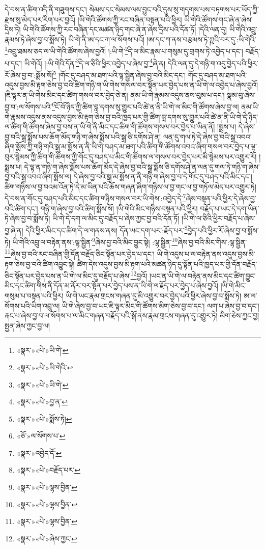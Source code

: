 དེ་བས་ན་ཚིག་འདི་ནི་གཟུགས་དང་། སེམས་དང་སེམས་ལས་བྱུང་བའི་དུས་སུ་གདགས་པས་བཏགས་པར་ཡོད་ཀྱི་རྫས་སུ་མེད་པར་རིག་པར་བྱའོ། །ཡི་གེའི་ཚོགས་ཀྱི་རང་བཞིན་བསྟན་པའི་ཕྱིར། ཡི་གེའི་ཚོགས་གང་ཞེ་ན་ཞེས་དྲིས་ཏེ། ཡི་གེའི་ཚོགས་ཀྱི་རང་བཞིན་དང་མཚན་ཉིད་གང་ཞེ་ན་ཞེས་དྲིས་པའི་དོན་ཏོ། །དེའི་ལན་དུ། ཡི་གེའི་འབྲུ་རྣམས་ཏེ་ཞེས་བྱ་བ་སྨོས་ཏེ། ཡི་གེ་ནི་ཨ་དང་ཀ་ལ་སོགས་པའོ། །ཨ་དང་ཀ་ནས་བརྩམས་ཏེ་ཀྵའི་བར་དུ་:ཡི་གེའི་\footnote{«སྣར་»«པེ་»ཡི་གེ་}འབྲུ་ཐམས་ཅད་ལ་ཡི་གེའི་ཚོགས་ཞེས་བྱའོ། །:ཡི་གེ་\footnote{«སྣར་»«པེ་»ཡི་གེའི་}དེ་ལ་མིང་རྣམ་པ་གསུམ་དུ་གྲགས་ཏེ་འབྱེད་པ་དང་། བརྗོད་པ་དང་། ཡི་གེའོ། །:ཡི་གེའི་དོན་\footnote{«སྣར་»«པེ་»ཡི་གེ་}དེ་ལ་ཅིའི་ཕྱིར་འབྱེད་པ་ཞེས་བྱ་\footnote{«སྣར་»«པེ་»བྱ་ན་}ཞེ་ན། དེའི་ལན་དུ་དེ་གཉི་ག་འདུ་བྱེད་པའི་ཕྱིར་རོ་ཞེས་བྱ་བ་:སྨོས་སོ།\footnote{«སྣར་»«པེ་»སྨོས་ཏེ།} །གོང་དུ་བཤད་མ་ཐག་པའི་ལྷ་སྦྱིན་ཞེས་བྱ་བའི་མིང་དང་། གོང་དུ་བཤད་མ་ཐག་པའི་འདུས་བྱས་མི་རྟག་ཅེས་བྱ་བའི་ཚིག་གཉི་ག་ཡི་གེས་གསལ་བར་སྟོན་པར་བྱེད་པས་ན་ཡི་གེ་ལ་འབྱེད་པ་ཞེས་བྱའོ། །ཇི་ལྟར་ན་ཡི་གེས་མིང་དང་ཚིག་གསལ་བར་བྱེད་ཅེ་ན། ནམ་ཡི་གེ་རྣམས་འདུས་ནས་བུམ་པ་དང་། སྣམ་བུ་ཞེས་བྱ་བ་:ལ་སོགས་པའི་\footnote{«ཅོ་»ལ་སོགས་པ་}ངོ་བོ་ཉིད་ཀྱི་ཚིག་བླ་དགས་སུ་གྱུར་པའི་ཚེ་ན་ནི་ཡི་གེ་ལ་མིང་གི་ཚོགས་ཞེས་བྱ་ལ། ནམ་ཡི་གེ་རྣམས་འདུས་ནས་འདུས་བྱས་མི་རྟག་ཅེས་བྱ་བའི་ཁྱད་པར་གྱི་ཚིག་བླ་དགས་སུ་གྱུར་པའི་ཚེ་ན་ནི་ཡི་གེ་དེ་ཉིད་ལ་ཚིག་གི་ཚོགས་ཞེས་བྱ་བས་ན་ཡི་གེ་ནི་མིང་དང་ཚིག་གི་ཚོགས་གསལ་བར་བྱེད་པ་ཡིན་ནོ། །སྨྲས་པ། དེ་ཞེས་བྱ་བའི་སྒྲ་སྨོས་པས་ཆོག་མོད་གཉི་ག་ཞེས་སྨོས་པའི་སྒྲ་ཅི་དགོས་ཤེ་ན། ལན་དུ་གལ་ཏེ་དེ་ཞེས་བྱ་བའི་སྒྲ་འབའ་ཞིག་སྨོས་ཀྱི་གཉི་གའི་སྒྲ་མ་སྨོས་ན་ནི་ཡི་གེ་བཤད་མ་ཐག་པའི་ཚིག་གི་ཚོགས་འབའ་ཞིག་གསལ་བར་བྱེད་པ་ལྟ་བུར་སྙེམས་ཀྱི་ཚིག་གི་ཚོགས་ཀྱི་གོང་དུ་བཤད་པ་མིང་གི་ཚོགས་ལ་གསལ་བར་བྱེད་པར་མི་སྙེམས་པར་འགྱུར་རོ། །སྨྲས་པ། དེ་ལྟ་ན་གཉི་ག་ཞེས་སྨོས་པས་ཆོག་མོད་དེ་ཞེས་བྱ་བའི་སྒྲ་སྨོས་ཅི་དགོས་ཤེ་ན་ལན་དུ་གལ་ཏེ་གཉི་ག་ཞེས་བྱ་བའི་སྒྲ་འབའ་ཞིག་སྨོས་ལ། དེ་ཞེས་བྱ་བའི་སྒྲ་མ་སྨོས་ན་ནི་གཉི་ག་ཞེས་བྱ་བ་དེ་གོང་དུ་བཤད་པའི་མིང་དང་། ཚིག་གཉིས་ལ་བྱ་བའམ་འོན་ཏེ་དེ་མ་ཡིན་པའི་ཆོས་གཞན་ཞིག་གཉིས་ལ་བྱ་གང་ལ་བྱ་གཏོལ་མེད་པར་འགྱུར་ཏེ། དེ་བས་ན་གོང་དུ་བཤད་པའི་མིང་དང་ཚིག་གཉིས་གསལ་བར་ཡི་གེས་:འབྱེད་དེ་\footnote{«སྣར་»འབྱེད་དོ་}ཞེས་བསྟན་པའི་ཕྱིར་དེ་ཞེས་བྱ་བའི་ཚིག་དང་། གཉི་ག་ཞེས་བྱ་བའི་ཚིག་སྨོས་སོ། །ཡི་གེའི་མིང་གཉིས་བསྟན་པའི་ཕྱིར། བརྗོད་པ་ཡང་དེ་དག་ཡིན་ཏེ་ཞེས་བྱ་བ་སྨོས་ཏེ། ཡི་གེ་དེ་དག་ལ་མིང་དུ་བརྗོད་པ་ཞེས་ཀྱང་བྱ་བའི་དོན་ཏོ། །ཡི་གེ་ལ་ཅིའི་ཕྱིར་བརྗོད་པ་ཞེས་བྱ་ཞེ་ན། དེའི་ཕྱིར་མིང་དང་ཚིག་དེ་ལ་གནས་ནས། དོན་ཡང་དག་པར་:རྗོད་པར་\footnote{«སྣར་»«པེ་»བརྗོད་པར་}བྱེད་པའི་ཕྱིར་རོ་ཞེས་བྱ་བ་སྨོས་ཏེ། ཡི་གེའི་འབྲུ་ལ་བརྟེན་ནས་:ལྷ་སྦྱིན་\footnote{«སྣར་»«པེ་»ལྷས་བྱིན་}ཞེས་བྱ་བའི་མིང་བྱུང་སྟེ། :ལྷ་སྦྱིན་\footnote{«སྣར་»«པེ་»ལྷས་བྱིན་}ཞེས་བྱ་བའི་མིང་གིས་:ལྷ་སྦྱིན་\footnote{«སྣར་»«པེ་»ལྷས་བྱིན་}ཞེས་བྱ་བའི་རང་བཞིན་གྱི་དོན་བརྗོད་ཅིང་སྟོན་པར་བྱེད་པ་དང་། ཡི་གེ་འདུས་པ་ལ་བརྟེན་ནས་འདུས་བྱས་མི་རྟག་ཅེས་བྱ་བའི་ཚིག་འབྱུང་སྟེ། ཚིག་དེས་འདུས་བྱས་མི་རྟག་པའི་མཚན་ཉིད་དུ་སྟོན་པའི་ཁྱད་པར་གྱི་དོན་བརྗོད་ཅིང་སྟོན་པར་བྱེད་པས་ན་ཡི་གེ་ལ་མིང་དུ་བརྗོད་པ་ཞེས་\footnote{«སྣར་»«པེ་»ཞེས་ཀྱང་}བྱའོ། །ཡང་ན་ཡི་གེ་ལ་བརྟེན་ནས་མིང་དང་ཚིག་བྱུང་མིང་དང་ཚིག་གིས་ནི་དོན་མ་ནོར་བར་སྟོན་པར་བྱེད་པས་ན་ཡི་གེ་ལ་རྗོད་པར་བྱེད་པ་ཞེས་བྱའོ། །ཡི་གེ་མིང་གསུམ་པ་བསྟན་པའི་ཕྱིར། ཡི་གེ་ཡང་རྣམ་གྲངས་གཞན་དུ་མི་འགྱུར་བར་བྱེད་པའི་ཕྱིར་ཞེས་བྱ་བ་སྨོས་ཏེ། ཨ་ལ་སོགས་པའི་ཡིག་འབྲུ་ལ། ཡི་གེ་ཞེས་བྱ་བ་ཡང་ཇི་ལྟར་མིང་གི་ཚོགས་མིག་ཅེས་བྱ་བ་དང་། ལག་པ་ཞེས་བྱ་བ་དང་། རྐང་པ་ཞེས་བྱ་བ་ལ་སོགས་པ་ལ་མིང་གཞན་བརྗོད་པའི་སྒོ་ནས་རྣམ་གྲངས་གཞན་དུ་འགྱུར་ཏེ། མིག་ཅེས་ཀྱང་བྱ། སྤྱན་ཞེས་ཀྱང་བྱ་ལ། 